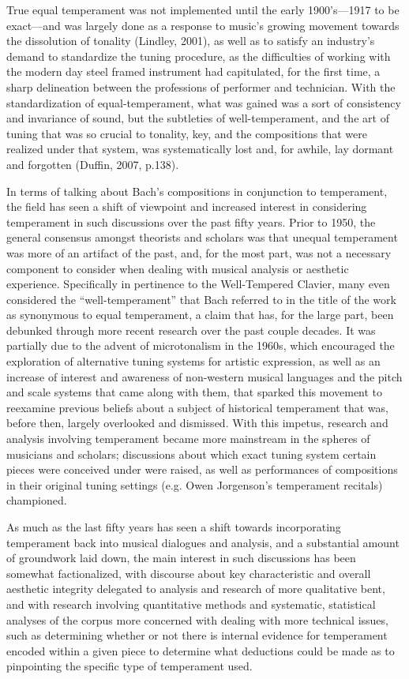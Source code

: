 True equal temperament was not implemented until the early 1900's---1917
to be exact---and was largely done as a response to music's growing
movement towards the dissolution of tonality (Lindley, 2001), as well as
to satisfy an industry's demand to standardize the tuning procedure, as
the difficulties of working with the modern day steel framed instrument
had capitulated, for the first time, a sharp delineation between the
professions of performer and technician. With the standardization of
equal-temperament, what was gained was a sort of consistency and
invariance of sound, but the subtleties of well-temperament, and the art
of tuning that was so crucial to tonality, key, and the compositions
that were realized under that system, was systematically lost and, for
awhile, lay dormant and forgotten (Duffin, 2007, p.138).

In terms of talking about Bach's compositions in conjunction to
temperament, the field has seen a shift of viewpoint and increased
interest in considering temperament in such discussions over the past
fifty years. Prior to 1950, the general consensus amongst theorists and
scholars was that unequal temperament was more of an artifact of the
past, and, for the most part, was not a necessary component to consider
when dealing with musical analysis or aesthetic experience. Specifically
in pertinence to the Well-Tempered Clavier, many even considered the
``well-temperament'' that Bach referred to in the title of the work as
synonymous to equal temperament, a claim that has, for the large part,
been debunked through more recent research over the past couple decades.
It was partially due to the advent of microtonalism in the 1960s, which
encouraged the exploration of alternative tuning systems for artistic
expression, as well as an increase of interest and awareness of
non-western musical languages and the pitch and scale systems that came
along with them, that sparked this movement to reexamine previous
beliefs about a subject of historical temperament that was, before then,
largely overlooked and dismissed. With this impetus, research and
analysis involving temperament became more mainstream in the spheres of
musicians and scholars; discussions about which exact tuning system
certain pieces were conceived under were raised, as well as performances
of compositions in their original tuning settings (e.g. Owen Jorgenson's
temperament recitals) championed.

As much as the last fifty years has seen a shift towards incorporating
temperament back into musical dialogues and analysis, and a substantial
amount of groundwork laid down, the main interest in such discussions
has been somewhat factionalized, with discourse about key characteristic
and overall aesthetic integrity delegated to analysis and research of
more qualitative bent, and with research involving quantitative methods
and systematic, statistical analyses of the corpus more concerned with
dealing with more technical issues, such as determining whether or not
there is internal evidence for temperament encoded within a given piece
to determine what deductions could be made as to pinpointing the
specific type of temperament used.

